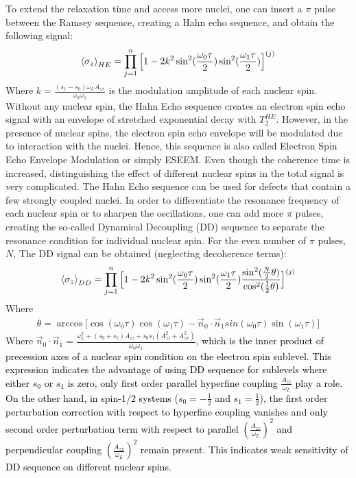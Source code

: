 \documentclass[%
 reprint,
superscriptaddress,
 amsmath,amssymb,
 aps,
]{revtex4-2}
\renewcommand{\vec}[1]{\overrightarrow{#1}}
\begin{document}
To extend the relaxation time and access more nuclei, one can insert a $\pi$ pulse between the Ramsey sequence, creating a Hahn echo sequence, and obtain the following signal:
\begin{gather}
	\expval{\sigma_z}_{HE} = \prod_{j=1}^n \Big[1 - 2 k^2 
	\sin^2(\frac{\omega_0 \tau}{2}) \sin^2(\frac{\omega_1 \tau}{2})\Big]^{(j)} %
\end{gather}
Where $k = \frac{(s_1-s_0)\omega_L A_{zx}}{\omega_0 \omega_1}$ is the modulation amplitude of each nuclear spin.
Without any nuclear spin, the Hahn Echo sequence creates an electron spin echo signal with an envelope of stretched exponential decay with $T_2^{HE}$.
However, in the presence of nuclear spins, the electron spin echo envelope will be modulated due to interaction with the nuclei.
Hence, this sequence is also called Electron Spin Echo Envelope Modulation or simply ESEEM.
Even though the coherence time is increased, distinguishing the effect of different nuclear spins in the total signal is very complicated.
The Hahn Echo sequence can be used for defects that contain a few strongly coupled nuclei.
In order to differentiate the resonance frequency of each nuclear spin or to sharpen the oscillations, one can add more $\pi$ pulses, creating the so-called Dynamical Decoupling (DD) sequence to separate the resonance condition for individual nuclear spin. For the even number of $\pi$ pulses, $N$, The DD signal can be obtained (neglecting decoherence terms):
\begin{gather} \label{eq:DD}
	\expval{\sigma_z}_{DD} =
	\prod_{j=1}^n \Big[1- 2 k^2  
	\sin^2(\frac{\omega_0 \tau}{2}) \sin^2(\frac{\omega_1 \tau}{2}) \frac{\sin^2(\frac{N}{2} \theta)}{\cos^2(\frac{1}{2}\theta)}  \Big]^{(j)}
\end{gather}
\normalsize
Where
\begin{gather}
	\theta=  \arccos\Big[\cos(\omega_0 \tau) \cos(\omega_1 \tau)- \vec{n}_0 \cdot \vec{n}_1 sin(\omega_0 \tau) \sin(\omega_1 \tau) \Big]
\end{gather}
Where $\vec{n}_0 \cdot \vec{n}_1 = \frac{\omega_L^2+(s_0+s_1)A_{zz}+s_0 s_1 (A_{zz}^2+A_{zx}^2)}{\omega_0 \omega_1}$, \textcolor{black}{which is the inner product of precession axes of a nuclear spin condition on the electron spin sublevel. This expression indicates the advantage of using DD sequence for sublevels where either $s_0$ or $s_1$ is zero, only first order parallel hyperfine coupling $\frac{A_{zz}}{\omega_L}$ play a role. On the other hand, in spin-1/2 systems ($s_0=-\frac{1}{2}$ and $s_1=\frac{1}{2}$), the first order perturbation correction with respect to hyperfine coupling vanishes and only second order perturbation term with respect to parallel $(\frac{A_{zz}}{\omega_L})^2$  and perpendicular coupling $(\frac{A_{zx}}{\omega_L})^2$ remain present. This indicates weak sensitivity of DD sequence on different nuclear spins}.
\end{document}
